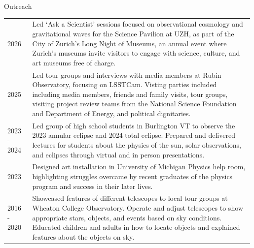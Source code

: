 \begin{rSection}{Outreach}
\setlength{\extrarowheight}{3pt}
\begin{longtable}{p{0.1\linewidth}p{0.89\linewidth}}
2026 & Led `Ask a Scientist' sessions focused on observational cosmology and gravitational waves for the Science Pavilion at UZH, as part of the City of Zurich's Long Night of Museums, an annual event where Zurich's museums invite visitors to engage with science, culture, and art museums free of charge.\\
2025 & Led tour groups and interviews with media members at Rubin Observatory, focusing on \ac{LSSTCam}. Visting parties included including media members, friends and family visits, tour groups, visiting project review teams from the National Science Foundation and Department of Energy, and political dignitaries.\\
2023 - 2024 & Led group of high school students in Burlington VT to observe the 2023 annular eclipse and 2024 total eclipse. Prepared and delivered lectures for students about the physics of the sun, solar observations, and eclipses through virtual and in person presentations.\\
2023 & Designed art installation in University of Michigan Physics help room, highlighting struggles overcame by recent graduates of the physics program and success in their later lives.\\
2016 - 2020 & Showcased features of different telescopes to local tour groups at Wheaton College Observatory. Operate and adjust telescopes to show appropriate stars, objects, and events based on sky conditions. Educated children and adults in how to locate objects and explained features about the objects on sky.
    \end{longtable}
\end{rSection}
